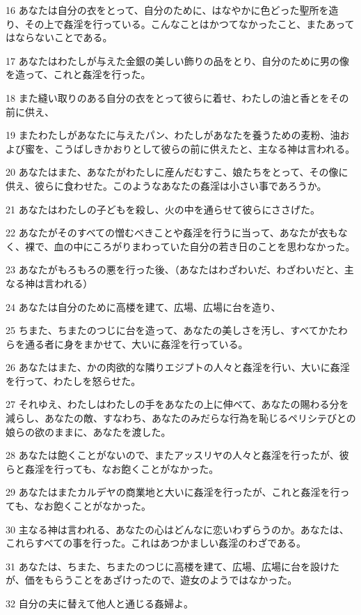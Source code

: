 \par 16 あなたは自分の衣をとって、自分のために、はなやかに色どった聖所を造り、その上で姦淫を行っている。こんなことはかつてなかったこと、またあってはならないことである。
\par 17 あなたはわたしが与えた金銀の美しい飾りの品をとり、自分のために男の像を造って、これと姦淫を行った。
\par 18 また縫い取りのある自分の衣をとって彼らに着せ、わたしの油と香とをその前に供え、
\par 19 またわたしがあなたに与えたパン、わたしがあなたを養うための麦粉、油および蜜を、こうばしきかおりとして彼らの前に供えたと、主なる神は言われる。
\par 20 あなたはまた、あなたがわたしに産んだむすこ、娘たちをとって、その像に供え、彼らに食わせた。このようなあなたの姦淫は小さい事であろうか。
\par 21 あなたはわたしの子どもを殺し、火の中を通らせて彼らにささげた。
\par 22 あなたがそのすべての憎むべきことや姦淫を行うに当って、あなたが衣もなく、裸で、血の中にころがりまわっていた自分の若き日のことを思わなかった。
\par 23 あなたがもろもろの悪を行った後、（あなたはわざわいだ、わざわいだと、主なる神は言われる）
\par 24 あなたは自分のために高楼を建て、広場、広場に台を造り、
\par 25 ちまた、ちまたのつじに台を造って、あなたの美しさを汚し、すべてかたわらを通る者に身をまかせて、大いに姦淫を行っている。
\par 26 あなたはまた、かの肉欲的な隣りエジプトの人々と姦淫を行い、大いに姦淫を行って、わたしを怒らせた。
\par 27 それゆえ、わたしはわたしの手をあなたの上に伸べて、あなたの賜わる分を減らし、あなたの敵、すなわち、あなたのみだらな行為を恥じるペリシテびとの娘らの欲のままに、あなたを渡した。
\par 28 あなたは飽くことがないので、またアッスリヤの人々と姦淫を行ったが、彼らと姦淫を行っても、なお飽くことがなかった。
\par 29 あなたはまたカルデヤの商業地と大いに姦淫を行ったが、これと姦淫を行っても、なお飽くことがなかった。
\par 30 主なる神は言われる、あなたの心はどんなに恋いわずらうのか。あなたは、これらすべての事を行った。これはあつかましい姦淫のわざである。
\par 31 あなたは、ちまた、ちまたのつじに高楼を建て、広場、広場に台を設けたが、価をもらうことをあざけったので、遊女のようではなかった。
\par 32 自分の夫に替えて他人と通じる姦婦よ。
